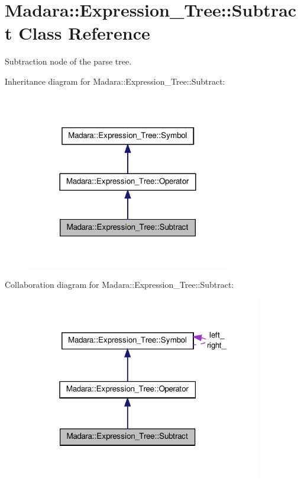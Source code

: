 \hypertarget{classMadara_1_1Expression__Tree_1_1Subtract}{
\section{Madara::Expression\_\-Tree::Subtract Class Reference}
\label{d8/d2e/classMadara_1_1Expression__Tree_1_1Subtract}
}


Subtraction node of the parse tree.  




Inheritance diagram for Madara::Expression\_\-Tree::Subtract:
\nopagebreak
\begin{figure}[H]
\begin{center}
\leavevmode
\includegraphics[width=252pt]{d0/d26/classMadara_1_1Expression__Tree_1_1Subtract__inherit__graph}
\end{center}
\end{figure}


Collaboration diagram for Madara::Expression\_\-Tree::Subtract:
\nopagebreak
\begin{figure}[H]
\begin{center}
\leavevmode
\includegraphics[width=292pt]{dc/db0/classMadara_1_1Expression__Tree_1_1Subtract__coll__graph}
\end{center}
\end{figure}
